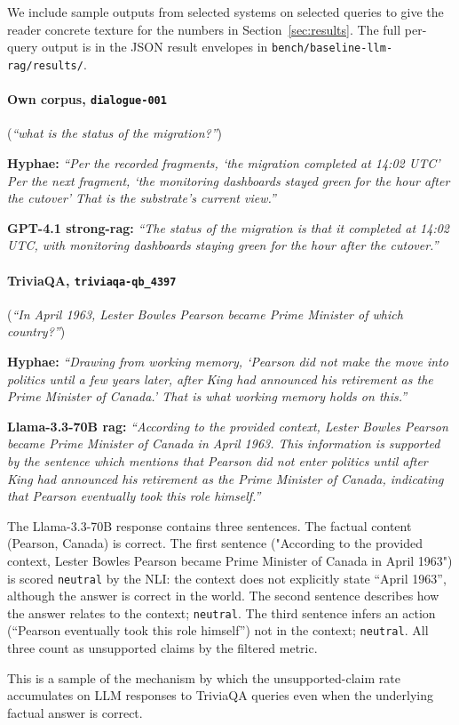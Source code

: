We include sample outputs from selected systems on selected
queries to give the reader concrete texture for the numbers in
Section~\ref{sec:results}. The full per-query output is in the
JSON result envelopes in
\texttt{bench/baseline-llm-rag/results/}.

\paragraph{Own corpus, \texttt{dialogue-001}}
(\emph{``what is the status of the migration?''})

\textbf{Hyphae:} \emph{``Per the recorded fragments, `the
migration completed at 14:02 UTC' Per the next fragment, `the
monitoring dashboards stayed green for the hour after the
cutover' That is the substrate's current view.''}

\textbf{GPT-4.1 strong-rag:} \emph{``The status of the migration
is that it completed at 14:02 UTC, with monitoring dashboards
staying green for the hour after the cutover.''}

\paragraph{TriviaQA, \texttt{triviaqa-qb\_4397}}
(\emph{``In April 1963, Lester Bowles Pearson became Prime
Minister of which country?''})

\textbf{Hyphae:} \emph{``Drawing from working memory, `Pearson
did not make the move into politics until a few years later,
after King had announced his retirement as the Prime Minister
of Canada.' That is what working memory holds on this.''}

\textbf{Llama-3.3-70B rag:} \emph{``According to the provided
context, Lester Bowles Pearson became Prime Minister of Canada
in April 1963. This information is supported by the sentence
which mentions that Pearson did not enter politics until after
King had announced his retirement as the Prime Minister of
Canada, indicating that Pearson eventually took this role
himself.''}

The Llama-3.3-70B response contains three sentences. The
factual content (Pearson, Canada) is correct. The first
sentence ("According to the provided context, Lester Bowles
Pearson became Prime Minister of Canada in April 1963") is
scored \texttt{neutral} by the NLI: the context does not
explicitly state ``April 1963'', although the answer is correct
in the world. The second sentence describes how the answer
relates to the context; \texttt{neutral}. The third sentence
infers an action (``Pearson eventually took this role himself'')
not in the context; \texttt{neutral}. All three count as
unsupported claims by the filtered metric.

This is a sample of the mechanism by which the unsupported-claim
rate accumulates on LLM responses to TriviaQA queries even when
the underlying factual answer is correct.
